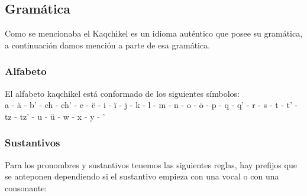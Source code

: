 \documentclass[a4paper,openright,11pt]{article}
\begin{document}
\newpage
\subsection{Gramática}
Como se mencionaba el Kaqchikel es un idioma auténtico que posee su gramática, a continuación damos mención a parte de esa gramática.\\

\subsubsection{Alfabeto}
El alfabeto kaqchikel está conformado de los siguientes símbolos:\\
a - ä - b' - ch - ch' - e - ë - i - ï - j - k - l - m - n - o - ö - p - q - q' - r - s - t - t' - tz - tz' - u - ü - w - x - y - '

\subsubsection{Sustantivos}
Para los pronombres y sustantivos tenemos las siguientes reglas, hay prefijos que se anteponen dependiendo si el sustantivo empieza con una vocal o con una consonante:
\begin{table}[H]
	\caption{Reglas gramaticales de Sustantivos}
\end{table}
\end{document}
